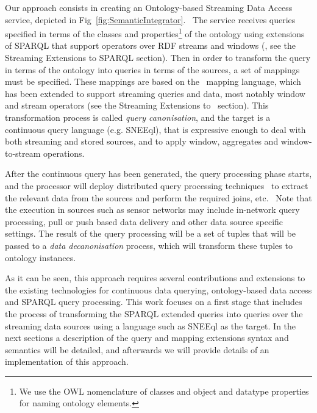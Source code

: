 Our approach consists in creating an Ontology-based Streaming Data Access service, depicted in Fig~\ref{fig:SemanticIntegrator}.\ %
The service receives queries specified in terms of the classes and properties\footnote{We use the OWL nomenclature of
classes and object and datatype properties for naming ontology elements.} of the ontology using extensions of SPARQL
that support operators over RDF streams and windows (\sparqlstr, see the Streaming Extensions to SPARQL section). %
Then in order to transform the query in terms of the ontology into queries in terms of the sources, a set of mappings must be
specified. These mappings are based on the \rtwoo\ mapping language, which has been extended to support  streaming
queries and data, most notably window and stream operators (see the Streaming Extensions to \rtwoo\ section).%
This transformation process is called \textit{query canonisation}, and the target is a continuous query language (e.g. SNEEql), that is
expressive enough to deal with both streaming and stored sources, and to apply window, aggregates and window-to-stream
operations.

After the continuous query has been generated, the query processing phase starts, and the processor will deploy distributed query processing techniques~\cite{Kossmann_00} to extract the relevant data from the sources and perform the required joins, etc.\ %
%
Note that the execution in sources such as sensor networks may include in-network query processing, pull or push based data delivery and other data source specific settings. The result of the query processing will be a set of tuples that will be passed to a \textit{data decanonisation} process, which will transform these tuples to ontology instances.

As it can be seen, this approach requires several contributions and extensions to the existing technologies for continuous data querying, ontology-based data access and SPARQL query processing. This work focuses on a first stage that includes the process of transforming the SPARQL extended queries into queries over the streaming data sources using a language such as SNEEql as the target. In the next sections a description of the query and mapping extensions syntax and semantics will be detailed, and afterwards we will provide details of an implementation of this approach.
